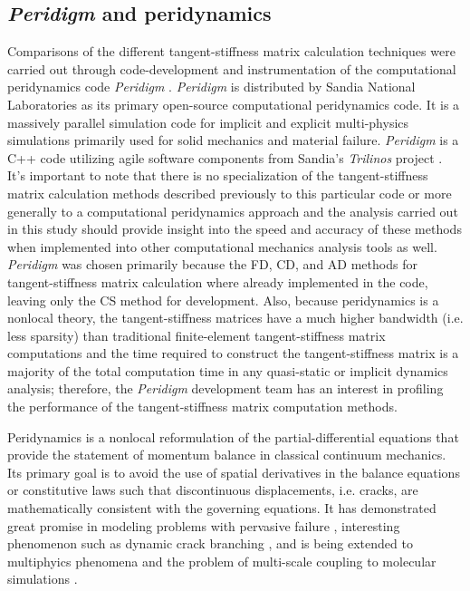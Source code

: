\documentclass[preprint,12pt]{elsarticle}
\begin{document}
\subsection{\emph{Peridigm} and peridynamics}
\label{subsec:PaP}
%
Comparisons of the different tangent-stiffness matrix calculation techniques were
carried out through code-development and instrumentation of the
computational peridynamics code \emph{Peridigm} \cite{peridigm}.
\emph{Peridigm} is distributed by Sandia National Laboratories as its primary
open-source computational peridynamics code. It is a massively parallel
simulation code for implicit and explicit multi-physics simulations primarily
used for solid mechanics and material failure. \emph{Peridigm} is a C++ code
utilizing agile software components from Sandia's  \emph{Trilinos} project
\cite{trilinos}. It's important to note that there is no specialization of the
tangent-stiffness matrix calculation methods described previously to this particular
code or more generally to a computational peridynamics approach and the
analysis carried out in this study should provide insight into the speed and
accuracy of these methods when implemented into other computational mechanics
analysis tools as well.  \emph{Peridigm} was chosen primarily because the FD,
CD, and AD methods for tangent-stiffness matrix calculation where already implemented
in the code, leaving only the CS method for development. Also, because
peridynamics is a nonlocal theory, the tangent-stiffness matrices have a much
higher bandwidth (i.e. less sparsity) than traditional finite-element
tangent-stiffness matrix computations and the time required to construct the
tangent-stiffness matrix is a majority of the total computation time in any
quasi-static or implicit dynamics analysis; therefore, the \emph{Peridigm}
development team has an interest in profiling the performance of the
tangent-stiffness matrix computation methods.

Peridynamics \cite{silling2000ret,silling:psa,silling2010peridynamic}
is a nonlocal reformulation of the partial-differential equations that provide
the statement of momentum balance in classical continuum mechanics. Its primary
goal is to avoid the use of spatial derivatives in the balance equations or
constitutive laws such that discontinuous displacements, i.e. cracks, are
mathematically consistent with the governing equations. It has demonstrated
great promise in modeling problems with pervasive failure
\cite{littlewood2010}, interesting phenomenon such as dynamic crack branching
\cite{ha2010sod}, and is being extended to multiphyics phenomena
\cite{bobaru2011peridynamic,katiyar2013} and the problem of multi-scale
coupling to molecular simulations \cite{seleson2009peridynamics,seleson2014atom}. 
\end{document}

